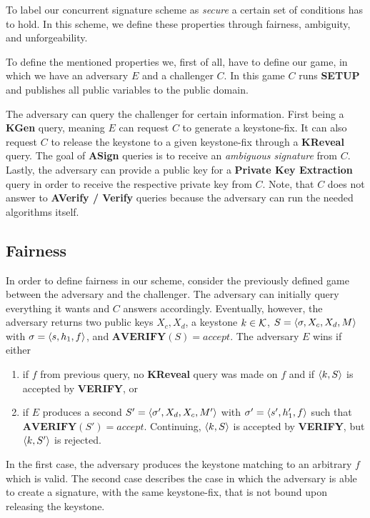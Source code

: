To label our concurrent signature scheme as \textit{secure} a certain set of conditions has to hold. 
  In this scheme, we define these properties through fairness, ambiguity, and unforgeability.
  
  To define the mentioned properties we, first of all, have to define our game, in which we have an adversary \(E\) and a challenger \(C\).
  In this game \(C\) runs \textbf{SETUP} and publishes all public variables to the public domain. 
  
  The adversary can query the challenger for certain information. 
  First being a \textbf{KGen} query, meaning \(E\) can request \(C\) to generate a keystone-fix.
  It can also request \(C\) to release the keystone to a given keystone-fix through a \textbf{KReveal} query.
  The goal of \textbf{ASign} queries is to receive an \textit{ambiguous signature} from \(C\). 
  Lastly, the adversary can provide a public key for a \textbf{Private Key Extraction} query in order to receive the respective private key from \(C\).
  Note, that \(C\) does not answer to \textbf{AVerify / Verify} queries because the adversary can run the needed algorithms itself.

  \subsection{Fairness}
    In order to define fairness in our scheme, consider the previously defined game between the adversary and the challenger.
    The adversary can initially query everything it wants and \(C\) answers accordingly.
    Eventually, however, the adversary returns two public keys \(X_c, X_d\), a keystone \(k\in\mathcal{K}\), \(S=\langle \sigma, X_c, X_d, M \rangle\) with \(\sigma=\langle s, h_1, f \rangle\), and \(\textbf{AVERIFY}(S) = accept\).
    The adversary \(E\) wins if either
      \begin{enumerate}
        \item if \(f\) from previous query, no \textbf{KReveal} query was made on \(f\) and if \(\langle k,S \rangle\) is accepted by \textbf{VERIFY}, or
        \item if \(E\) produces a second \(S' = \langle \sigma', X_d, X_c, M' \rangle\) with \(\sigma' = \langle s', h_1', f \rangle\) such that \(\textbf{AVERIFY}(S')=accept\).
              Continuing, \(\langle k,S \rangle\) is accepted by \textbf{VERIFY}, but  \(\langle k,S' \rangle\) is rejected.
      \end{enumerate}
    In the first case, the adversary produces the keystone matching to an arbitrary \(f\) which is valid.
    The second case describes the case in which the adversary is able to create a signature, with the same keystone-fix, that is not bound upon releasing the keystone.

